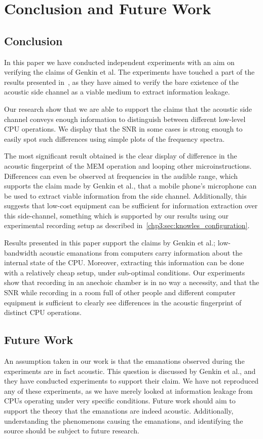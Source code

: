 \chapter{Conclusion and Future Work}\label{chp7:conclusion}

\section{Conclusion}
In this paper we have conducted independent experiments with an aim on verifying the claims of Genkin et al. 
The experiments have touched a part of the results presented in~\cite{DBLP:conf/crypto/GenkinST14}, as they have aimed to verify the bare existence of the acoustic side channel as a viable medium to extract information leakage.

Our research show that we are able to support the claims that the acoustic side channel conveys enough information to distinguish between different low-level CPU operations.
We display that the \gls{SNR} in some cases is strong enough to easily spot such differences using simple plots of the frequency spectra.

The most significant result obtained is the clear display of difference in the acoustic fingerprint of the MEM operation and looping other microinstructions.
Differences can even be observed at frequencies in the audible range, which supports the claim made by Genkin et al., that a mobile phone's microphone can be used to extract viable information from the side channel.
Additionally, this suggests that low-cost equipment can be sufficient for information extraction over this side-channel, something which is supported by our results using our experimental recording setup as described in~\autoref{chp3:sec:knowles_configuration}.

Results presented in this paper support the claims by Genkin et al.; low-bandwidth acoustic emanations from computers carry information about the internal state of the \gls{CPU}.
Moreover, extracting this information can be done with a relatively cheap setup, under sub-optimal conditions.
Our experiments show that recording in an anechoic chamber is in no way a necessity, and that the \gls{SNR} while recording in a room full of other people and different computer equipment is sufficient to clearly see differences in the acoustic fingerprint of distinct \gls{CPU} operations.

\section{Future Work}\label{chp7:sec:future_work}
An assumption taken in our work is that the emanations observed during the experiments are in fact acoustic.
This question is discussed by Genkin et al., and they have conducted experiments to support their claim.
We have not reproduced any of these experiments, as we have merely looked at information leakage from CPUs operating under very specific conditions.
Future work should aim to support the theory that the emanations are indeed acoustic.
Additionally, understanding the phenomenons causing the emanations, and identifying the source should be subject to future research.


